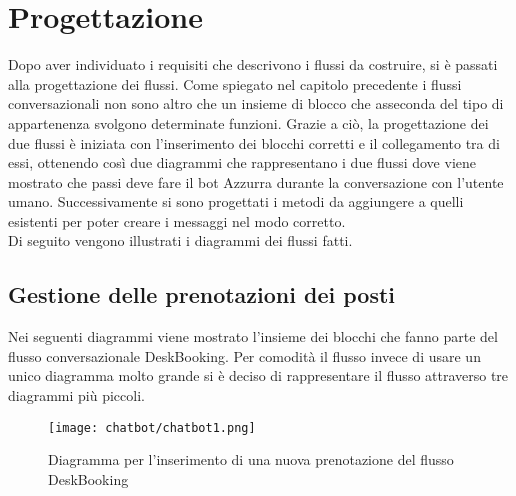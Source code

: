 \section{Progettazione}
Dopo aver individuato i requisiti che descrivono i flussi da costruire, si è passati alla progettazione dei flussi. Come spiegato nel capitolo precedente i flussi conversazionali non sono altro che un insieme di blocco che asseconda del tipo di appartenenza svolgono determinate funzioni. Grazie a ciò, la progettazione dei due flussi è iniziata con l'inserimento dei blocchi corretti e il collegamento tra di essi, ottenendo così due diagrammi che rappresentano i due flussi dove viene mostrato che passi deve fare il \gls{bot}\ap{[g]} Azzurra durante la conversazione con l'utente umano. Successivamente si sono progettati i metodi da aggiungere a quelli esistenti per poter creare i messaggi nel modo corretto.\\
Di seguito vengono illustrati i diagrammi dei flussi fatti.

\subsection{Gestione delle prenotazioni dei posti}
Nei seguenti diagrammi viene mostrato l'insieme dei blocchi che fanno parte del flusso conversazionale DeskBooking. Per comodità il flusso invece di usare un unico diagramma molto grande si è deciso di rappresentare il flusso attraverso tre diagrammi più piccoli.

\begin{figure}[h]
	\centering
	\texttt{[image: chatbot/chatbot1.png]}
	\caption{Diagramma per l'inserimento di una nuova prenotazione del flusso DeskBooking}\label{fig:ins}
\end{figure}

